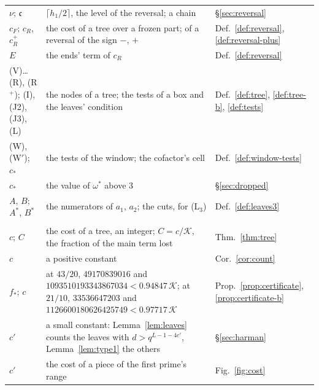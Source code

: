 \documentclass[11pt]{article}
\theoremstyle{definition}
\begin{document}
{\begin{longtable}{@{}>{\raggedright\arraybackslash}p{}
  >{\raggedright\arraybackslash}p{}
  >{\raggedright\arraybackslash}p{}@{}}
$\nu$; $\mathfrak c$ & $\lceil h_1/2 \rceil$, the level of the reversal; a chain & \S\ref{sec:reversal} \\
$c_F$; $c_R$, $c_R^+$ & the cost of a tree over a frozen part; of a reversal of the sign $-$, $+$ &
  Def.~\ref{def:reversal}, \ref{def:reversal-plus} \\
$E$ & the ends' term of $c_R$ & Def.~\ref{def:reversal} \\
(V)\ldots(R), (R$^+$); (I), (J2), (J3), (L) & the nodes of a tree; the tests of a box and the leaves' condition &
  Def.~\ref{def:tree}, \ref{def:tree-b}, \ref{def:tests} \\
(W), (W$'$); $c_*$ & the tests of the window; the cofactor's cell & Def.~\ref{def:window-tests} \\
$c_*$ & the value of $\omega^*$ above $3$ & \S\ref{sec:dropped} \\
$A$, $B$; $A^*$, $B^*$ & the numerators of $a_1$, $a_2$; the cuts, for (L$_3$) & Def.~\ref{def:leaves3} \\
\midrule
\multicolumn{3}{@{}l}{\emph{The certificates}} \\
$c$; $C$ & the cost of a tree, an integer; $C = c/\mathcal K$, the fraction of the main term lost &
  Thm.~\ref{thm:tree} \\
$c$ & a positive constant & Cor.~\ref{cor:count} \\
$f_*$; $c$ & at $43/20$, $49170839016$ and $1093510193343867034 < 0.94847\, \mathcal K$; at $21/10$, $33536647203$ and
  $1126600180626425749 < 0.97717\, \mathcal K$ & Prop.~\ref{prop:certificate}, \ref{prop:certificate-b} \\
$c'$ & a small constant: Lemma~\ref{lem:leaves} counts the leaves with $d > q^{L - 1 - 4c'}$, Lemma~\ref{lem:type1}
  the others & \S\ref{sec:harman} \\
$c'$ & the cost of a piece of the first prime's range & Fig.~\ref{fig:cost} \\
\bottomrule
\end{longtable}
}
\end{document}

